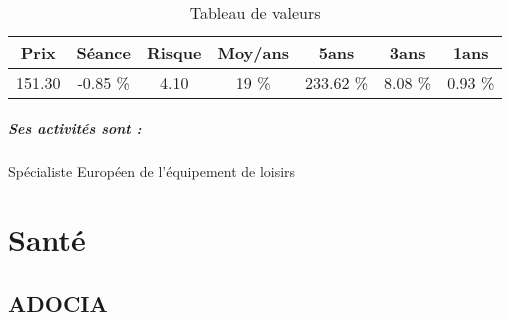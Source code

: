 \documentclass[11pt,a4paper]{report}%
\begin{document}
\begin{table}[H]
  \centering
    \begin{tabular}{|c|c|c|c|c|c|c|}
    \hline
    Prix & Séance & Risque  & Moy/ans & 5ans & 3ans & 1ans \\
    \hline
    151.30 &    -0.85 \%    & 4.10 & 19 \% & 233.62 \% & 8.08 \% & 0.93 \% \\
    \hline
    \end{tabular}%
        \label{tab:table_TRIGANO}%
      \caption{Tableau de valeurs}
\end{table}%

\paragraph{Ses activités sont : } Spécialiste Européen de l’équipement de loisirs 
    
    \newpage\chapter{Santé}


\section{ADOCIA}
\end{document}
